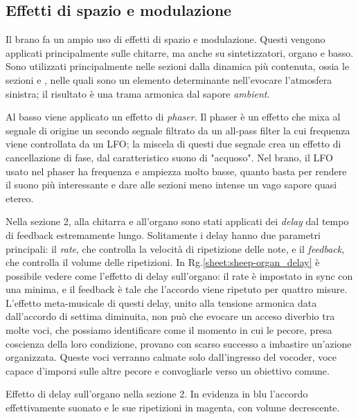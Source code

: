 \documentclass[class=book, crop=false, oneside, 12pt]{standalone}
\begin{document}
    \subsection{Effetti di spazio e modulazione}
    Il brano fa un ampio uso di effetti di spazio e modulazione. Questi vengono applicati principalmente sulle chitarre, ma anche su sintetizzatori, organo e basso. Sono utilizzati principalmente nelle sezioni dalla dinamica più contenuta, ossia le sezioni  e , nelle quali sono un elemento determinante nell'evocare l'atmosfera sinistra; il risultato è una trama armonica dal sapore \emph{ambient}.

    Al basso viene applicato un effetto di \emph{phaser}. Il phaser è un effetto che mixa al segnale di origine un secondo segnale filtrato da un all-pass filter la cui frequenza viene controllata da un LFO; la miscela di questi due segnale crea un effetto di cancellazione di fase, dal caratteristico suono di "acquoso". Nel brano, il LFO usato nel phaser ha frequenza e ampiezza molto basse, quanto basta per rendere il suono più interessante e dare alle sezioni meno intense un vago sapore quasi etereo.

    Nella sezione 2, alla chitarra e all'organo sono stati applicati dei \emph{delay} dal tempo di feedback estremamente lungo. Solitamente i delay hanno due parametri principali: il \emph{rate}, che controlla la velocità di ripetizione delle note, e il \emph{feedback}, che controlla il volume delle ripetizioni. In Rg.\ref{sheet:sheep-organ_delay} è possibile vedere come l'effetto di delay sull'organo: il rate è impostato in sync con una minima, e il feedback è tale che l'accordo viene ripetuto per quattro misure. L'effetto meta-musicale di questi delay, unito alla tensione armonica data dall'accordo di settima diminuita, non può che evocare un acceso diverbio tra molte voci, che possiamo identificare come il momento in cui le pecore, presa coscienza della loro condizione, provano con scarso successo a imbastire un'azione organizzata. Queste voci verranno calmate solo dall'ingresso del vocoder, voce capace d'imporsi sulle altre pecore e convogliarle verso un obiettivo comune.

    \begin{sheet}[htb]
        \centering
        \caption[Effetto di delay sull'organo.]{Effetto di delay sull'organo nella sezione 2. In evidenza in blu l'accordo effettivamente suonato  e le sue ripetizioni in magenta, con volume decrescente.}
        \label{sheet:sheep-organ_delay}
    \end{sheet}
\end{document}
